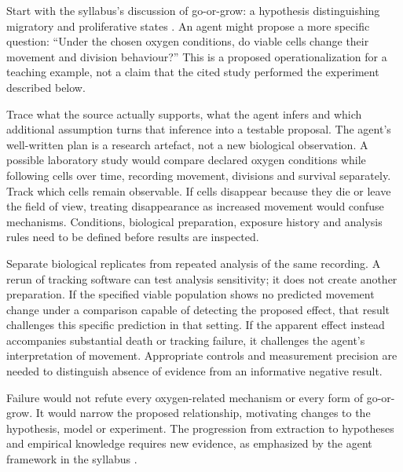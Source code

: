 \biomedicalanswer
{}
Start with the syllabus's discussion of go-or-grow: a hypothesis distinguishing migratory and proliferative states \citep{hatzikirou2012}. An agent might propose a more specific question: ``Under the chosen oxygen conditions, do viable cells change their movement and division behaviour?'' This is a proposed operationalization for a teaching example, not a claim that the cited study performed the experiment described below.

Trace what the source actually supports, what the agent infers and which additional assumption turns that inference into a testable proposal. The agent's well-written plan is a research artefact, not a new biological observation.
A possible laboratory study would compare declared oxygen conditions while following cells over time, recording movement, divisions and survival separately. Track which cells remain observable. If cells disappear because they die or leave the field of view, treating disappearance as increased movement would confuse mechanisms. Conditions, biological preparation, exposure history and analysis rules need to be defined before results are inspected.

Separate biological replicates from repeated analysis of the same recording. A rerun of tracking software can test analysis sensitivity; it does not create another preparation.
If the specified viable population shows no predicted movement change under a comparison capable of detecting the proposed effect, that result challenges this specific prediction in that setting. If the apparent effect instead accompanies substantial death or tracking failure, it challenges the agent's interpretation of movement. Appropriate controls and measurement precision are needed to distinguish absence of evidence from an informative negative result.

Failure would not refute every oxygen-related mechanism or every form of go-or-grow. It would narrow the proposed relationship, motivating changes to the hypothesis, model or experiment. The progression from extraction to hypotheses and empirical knowledge requires new evidence, as emphasized by the agent framework in the syllabus \citep{primeview2026}.

